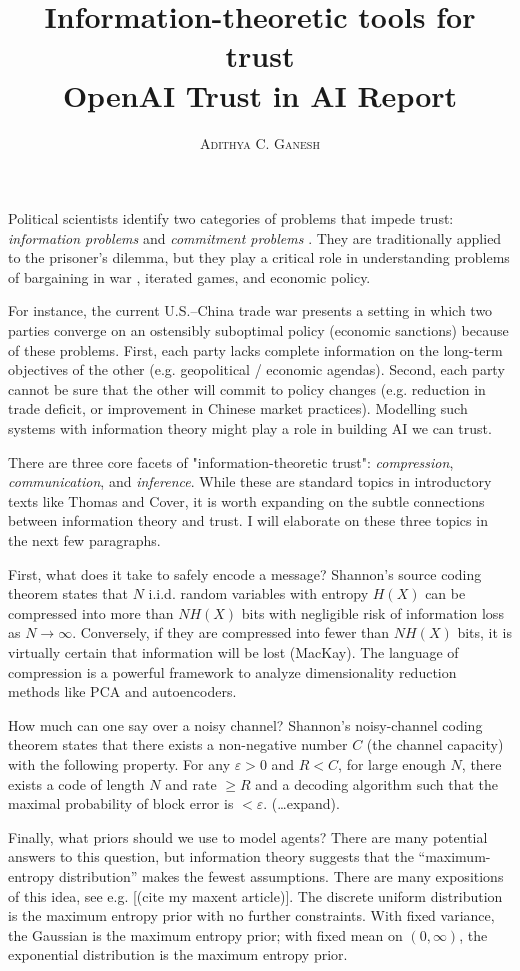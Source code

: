 \documentclass[11pt]{article}
\title{Information-theoretic tools for trust \\ \vspace{0.3cm} OpenAI Trust in AI Report}
\author{\textsc{Adithya C. Ganesh}}
\begin{document}
Political scientists identify two categories of problems that impede trust: {\it information problems} and {\it commitment problems} \cite{frieden2010world}.  They are traditionally applied to the prisoner's dilemma, but they play a critical role in understanding problems of bargaining in war \cite{lake2010two}, iterated games, and economic policy.

For instance, the current U.S.--China trade war presents a setting in which two parties converge on an ostensibly suboptimal policy (economic sanctions) because of these problems.  First, each party lacks complete information on the long-term objectives of the other (e.g. geopolitical / economic agendas).  Second, each party cannot be sure that the other will commit to policy changes (e.g. reduction in trade deficit, or improvement in Chinese market practices).  Modelling such systems with information theory might play a role in building AI we can trust.

There are three core facets of "information-theoretic trust": {\it compression}, {\it communication}, and {\it inference}.  While these are standard topics in introductory texts like Thomas and Cover, it is worth expanding on the subtle connections between information theory and trust.  I will elaborate on these three topics in the next few paragraphs.

First, what does it take to safely encode a message?  Shannon's source coding theorem states that $N$ i.i.d. random variables with entropy $H(X)$ can be compressed into more than $N H(X)$ bits with negligible risk of information loss as $N \to \infty$.  Conversely, if they are compressed into fewer than $N H(X)$ bits, it is virtually certain that information will be lost (MacKay).  The language of compression is a powerful framework to analyze dimensionality reduction methods like PCA and autoencoders.

How much can one say over a noisy channel?  Shannon's noisy-channel coding theorem states that there exists a non-negative number $C$ (the channel capacity) with the following property.  For any $\varepsilon > 0$ and $R < C$, for large enough $N$, there exists a code of length $N$ and rate $\geq R$ and a decoding algorithm such that the maximal probability of block error is $< \varepsilon$.  (\dots expand).

Finally, what priors should we use to model agents?  There are many potential answers to this question, but information theory suggests that the ``maximum-entropy distribution'' makes the fewest assumptions.  There are many expositions of this idea, see e.g. [(cite my maxent article)].  The discrete uniform distribution is the maximum entropy prior with no further constraints.  With fixed variance, the Gaussian is the maximum entropy prior; with fixed mean on $(0, \infty)$, the exponential distribution is the maximum entropy prior.
\end{document}
